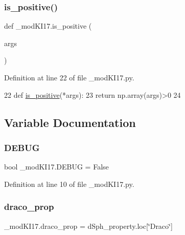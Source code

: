 \subsubsection{\texorpdfstring{is\+\_\+positive()}{is\_positive()}}
{\footnotesize\ttfamily def \+\_\+mod\+K\+I17.\+is\+\_\+positive (\begin{DoxyParamCaption}\item[{}]{args }\end{DoxyParamCaption})}



Definition at line 22 of file \+\_\+mod\+K\+I17.\+py.


\begin{DoxyCode}
22 \textcolor{keyword}{def }\hyperlink{namespace__modKI17_a445649df2eb1a8d89151f0327577bdce}{is\_positive}(*args):
23     \textcolor{keywordflow}{return} np.array(args)>0
24 
\end{DoxyCode}


\subsection{Variable Documentation}
\mbox{\label{namespace__modKI17_ae2b828e5fde2856ec9c553d1bb68975e}} 
\subsubsection{\texorpdfstring{D\+E\+B\+UG}{DEBUG}}
{\footnotesize\ttfamily bool \+\_\+mod\+K\+I17.\+D\+E\+B\+UG = False}



Definition at line 10 of file \+\_\+mod\+K\+I17.\+py.

\mbox{\label{namespace__modKI17_a7f903fd3e65a639eca726d9f0bcfaa9d}} 
\subsubsection{\texorpdfstring{draco\+\_\+prop}{draco\_prop}}
{\footnotesize\ttfamily \+\_\+mod\+K\+I17.\+draco\+\_\+prop = d\+Sph\+\_\+property.\+loc\mbox{[}\char`\"{}Draco\char`\"{}\mbox{]}}



